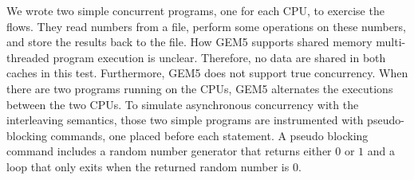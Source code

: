 \documentclass[conference]{IEEEtran}
\begin{document}

We wrote two simple concurrent programs, one for each CPU,
 to exercise the flows.  They read numbers from a file,
perform some operations on these numbers, and store the
results back to the file.  How GEM5 supports shared memory
multi-threaded program execution is unclear.  Therefore,
no data are shared in both caches in this test.
Furthermore, GEM5 does not support true concurrency.  When
there are two programs running on the CPUs, GEM5 alternates
the executions between the two CPUs.  To simulate
asynchronous concurrency with the interleaving semantics,
those two simple programs are instrumented with
pseudo-blocking commands, one placed before each statement.
A pseudo blocking command includes a random number generator
that returns either $0$ or $1$ and a loop that only exits
when the returned random number is $0$.

\end{document}

